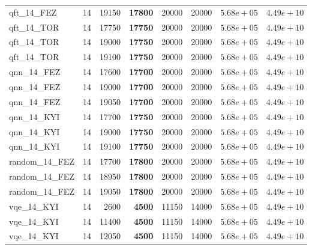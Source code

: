 \begin{table}[ht!]
\begin{tabular}{l c r r r r r r}
qft\_14\_FEZ & 14 & 19150 & \textbf{17800} & 20000 & 20000 & $5.68e+05$ & $4.49e+10$ \\
qft\_14\_TOR & 14 & 17750 & \textbf{17750} & 20000 & 20000 & $5.68e+05$ & $4.49e+10$ \\
qft\_14\_TOR & 14 & 19000 & \textbf{17750} & 20000 & 20000 & $5.68e+05$ & $4.49e+10$ \\
qft\_14\_TOR & 14 & 19100 & \textbf{17750} & 20000 & 20000 & $5.68e+05$ & $4.49e+10$ \\
qnn\_14\_FEZ & 14 & 17600 & \textbf{17700} & 20000 & 20000 & $5.68e+05$ & $4.49e+10$ \\
qnn\_14\_FEZ & 14 & 19000 & \textbf{17700} & 20000 & 20000 & $5.68e+05$ & $4.49e+10$ \\
qnn\_14\_FEZ & 14 & 19050 & \textbf{17700} & 20000 & 20000 & $5.68e+05$ & $4.49e+10$ \\
qnn\_14\_KYI & 14 & 17700 & \textbf{17750} & 20000 & 20000 & $5.68e+05$ & $4.49e+10$ \\
qnn\_14\_KYI & 14 & 19000 & \textbf{17750} & 20000 & 20000 & $5.68e+05$ & $4.49e+10$ \\
qnn\_14\_KYI & 14 & 19100 & \textbf{17750} & 20000 & 20000 & $5.68e+05$ & $4.49e+10$ \\
random\_14\_FEZ & 14 & 17700 & \textbf{17800} & 20000 & 20000 & $5.68e+05$ & $4.49e+10$ \\
random\_14\_FEZ & 14 & 18950 & \textbf{17800} & 20000 & 20000 & $5.68e+05$ & $4.49e+10$ \\
random\_14\_FEZ & 14 & 19050 & \textbf{17800} & 20000 & 20000 & $5.68e+05$ & $4.49e+10$ \\
vqe\_14\_KYI & 14 & 2600 & \textbf{4500} & 11150 & 14000 & $5.68e+05$ & $4.49e+10$ \\
vqe\_14\_KYI & 14 & 11400 & \textbf{4500} & 11150 & 14000 & $5.68e+05$ & $4.49e+10$ \\
vqe\_14\_KYI & 14 & 12050 & \textbf{4500} & 11150 & 14000 & $5.68e+05$ & $4.49e+10$ \\
\bottomrule
\end{tabular}
\end{table}

\clearpage


